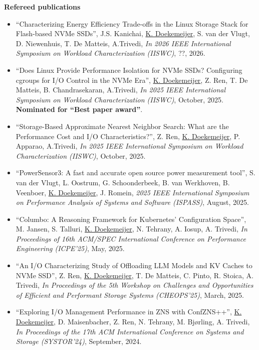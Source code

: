 \documentclass[letterpaper,11pt]{article}
\begin{document}
\textbf{Refereed publications}
\begin{itemize}[label={}]

\item
  ``Characterizing Energy Efficiency Trade-offs in the Linux Storage Stack for Flash-based NVMe SSDs'', 
  J.S. Kanichai, \underline{K. Doekemeijer},  S. van der Vlugt, D. Niewenhuis, T. De Matteis, A.Trivedi, 
  \textit{In 2026 IEEE International Symposium on Workload Characterization (IISWC)}, 
  ??, 2026.

\item
  ``Does Linux Provide Performance Isolation for NVMe SSDs? Configuring cgroups for I/O Control in the NVMe Era'', 
  \underline{K. Doekemeijer}, Z. Ren, T. De Matteis, B. Chandrasekaran, A.Trivedi, 
  \textit{In 2025 IEEE International Symposium on Workload Characterization (IISWC)}, 
  October, 2025.
  \textbf{Nominated for ``Best paper award''}.

\item
  ``Storage-Based Approximate Nearest Neighbor Search: What are the Performance Cost and I/O Characteristics?'', 
  Z. Ren, \underline{K. Doekemeijer},  P. Apparao, A.Trivedi, 
  \textit{In 2025 IEEE International Symposium on Workload Characterization (IISWC)}, 
  October, 2025.

\item
  ``PowerSensor3: A fast and accurate open source power measurement tool'', 
  S. van der Vlugt, L. Oostrum, G. Schoonderbeek, B. van Werkhoven, B. Veenboer, \underline{K. Doekemeijer}, J. Romein,
  \textit{2025 IEEE International Symposium on Performance Analysis of Systems and Software (ISPASS)}, 
  August, 2025.

\item
  ``Columbo: A Reasoning Framework for Kubernetes’ Configuration Space'', 
  M. Jansen, S. Talluri, \underline{K. Doekemeijer}, N. Tehrany, A. Iosup, A. Trivedi,
  \textit{In Proceedings of 16th ACM/SPEC International Conference on Performance Engineering (ICPE'25)}, 
  May, 2025.

\item
  ``An I/O Characterizing Study of Offloading LLM Models and KV Caches to NVMe SSD'', 
  Z. Ren, \underline{K. Doekemeijer}, T. De Matteis,  C. Pinto, R. Stoica, A. Trivedi,
  \textit{In Proceedings of the 5th Workshop on Challenges and Opportunities of Efficient and Performant Storage Systems (CHEOPS'25)}, 
  March, 2025.

\item
  ``Exploring I/O Management Performance in ZNS with ConfZNS++'', 
  \underline{K. Doekemeijer}, D. Maisenbacher, Z. Ren, N. Tehrany, M. Bjørling, A. Trivedi,
  \textit{In Proceedings of the 17th ACM International Conference on Systems and Storage (SYSTOR'24)}, 
  September, 2024.


\end{itemize}
\end{document}
